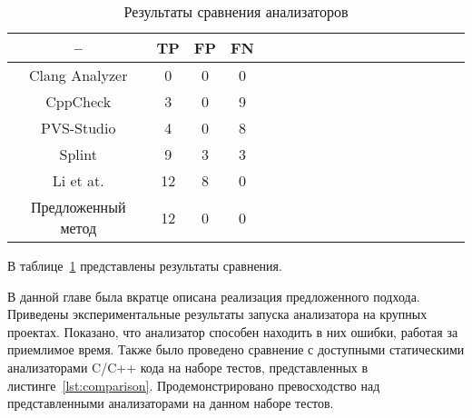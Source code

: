 \begin{table}[!h]
\caption{Результаты сравнения анализаторов}\label{tab:comparison}
\centering
  \begin{tabular}{|*{18}{c|}}\hline
  --                 & TP  & FP & FN \\\hline
  Clang Analyzer     & 0   & 0  & 0  \\\hline
  CppCheck           & 3   & 0  & 9  \\\hline
  PVS-Studio         & 4   & 0  & 8  \\\hline
  Splint             & 9   & 3  & 3  \\\hline
  Li et at.          & 12  & 8  & 0  \\\hline
  Предложенный метод & 12  & 0  & 0  \\\hline
  \end{tabular}
\end{table}

В таблице~\ref{tab:comparison} представлены результаты сравнения.

\chapterconclusion

В данной главе была вкратце описана реализация предложенного
подхода. Приведены экспериментальные результаты запуска анализатора на
крупных проектах. Показано, что анализатор способен находить в них
ошибки, работая за приемлимое время. Также было проведено сравнение с
доступными статическими анализаторами C/C++ кода на наборе тестов,
представленных в листинге~\ref{lst:comparison}. Продемонстрировано
превосходство над представленными анализаторами на данном наборе
тестов.
